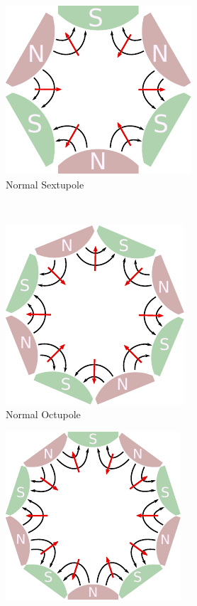 \begin{figure}[!htb]
    \begin{subfigure}{0.243\textwidth}
        \includegraphics[height=\magnetheight]{images/magnets/sextupole_normal.pdf}
        \caption{
           Normal Sextupole 
        }
        \label{fig:MSNorm}
    \end{subfigure}
    \\
    \begin{subfigure}{0.243\textwidth}
        \includegraphics[height=\magnetheight]{images/magnets/octupole_normal.pdf}
        \caption{
           Normal Octupole 
        }
        \label{fig:MONorm}
    \end{subfigure}
    \begin{subfigure}{0.243\textwidth}
        \includegraphics[height=\magnetheight]{images/magnets/decapole_normal.pdf}

\end{subfigure}
\end{figure}
